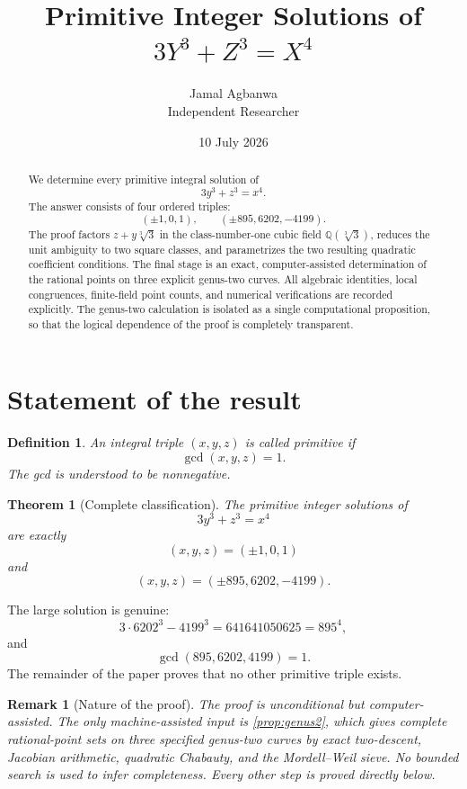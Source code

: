 \documentclass[11pt,a4paper]{article}
\title{Primitive Integer Solutions of\\[2mm]
\texorpdfstring{$3Y^3+Z^3=X^4$}{3Y^3+Z^3=X^4}}
\author{Jamal Agbanwa\\[-1mm]\small Independent Researcher}
\date{10 July 2026}
\newtheorem{theorem}{Theorem}[section]
\newtheorem{remark}[remark]{Remark}
\newtheorem{definition}[definition]{Definition}
\newcommand{\Q}{\mathbb Q}
\begin{document}
\maketitle

\begin{abstract}
We determine every primitive integral solution of
\[
3y^3+z^3=x^4.
\]
The answer consists of four ordered triples:
\[
(\pm1,0,1),\qquad (\pm895,6202,-4199).
\]
The proof factors $z+y\sqrt[3]{3}$ in the class-number-one cubic field
$\Q(\sqrt[3]{3})$, reduces the unit ambiguity to two square classes, and
parametrizes the two resulting quadratic coefficient conditions.  The final
stage is an exact, computer-assisted determination of the rational points on
three explicit genus-two curves.  All algebraic identities, local
congruences, finite-field point counts, and numerical verifications are
recorded explicitly.  The genus-two calculation is isolated as a single
computational proposition, so that the logical dependence of the proof is
completely transparent.
\end{abstract}

\tableofcontents

\section{Statement of the result}

\begin{definition}
An integral triple $(x,y,z)$ is called \emph{primitive} if
\[
\gcd(x,y,z)=1.
\]
The gcd is understood to be nonnegative.
\end{definition}

\begin{theorem}[Complete classification]\label{thm:main}
The primitive integer solutions of
\begin{equation}\label{eq:main}
3y^3+z^3=x^4
\end{equation}
are exactly
\[
\boxed{(x,y,z)=(\pm1,0,1)}
\]
and
\[
\boxed{(x,y,z)=(\pm895,6202,-4199)}.
\]
\end{theorem}

The large solution is genuine:
\[
3\cdot6202^3-4199^3
 =641641050625
 =895^4,
\]
and
\[
\gcd(895,6202,4199)=1.
\]
The remainder of the paper proves that no other primitive triple exists.

\begin{remark}[Nature of the proof]\label{rem:computer}
The proof is unconditional but computer-assisted.  The only machine-assisted
input is \cref{prop:genus2}, which gives complete rational-point sets on three
specified genus-two curves by exact two-descent, Jacobian arithmetic,
quadratic Chabauty, and the Mordell--Weil sieve.  No bounded search is used to
infer completeness.  Every other step is proved directly below.
\end{remark}
\end{document}
